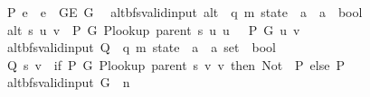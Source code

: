 \begin{isabellebody}
\ \ {\isachardoublequoteopen}P{\isacharprime}{\kern0pt}{\isacharprime}{\kern0pt}\ e\ {\isasymequiv}\ e\ {\isasymin}\ G{\isachardot}{\kern0pt}E\ G{}{\isachardoublequoteclose}\isanewline
\isanewline
{}\isamarkupfalse%
\ {\isacharparenleft}{\kern0pt}\ alt{\isacharunderscore}{\kern0pt}bfs{\isacharunderscore}{\kern0pt}valid{\isacharunderscore}{\kern0pt}input{\isacharparenright}{\kern0pt}\ alt\ {\isacharcolon}{\kern0pt}{\isacharcolon}{\kern0pt}\ {\isachardoublequoteopen}{\isacharparenleft}{\kern0pt}{\isacharprime}{\kern0pt}q{\isacharcomma}{\kern0pt}\ {\isacharprime}{\kern0pt}m{\isacharparenright}{\kern0pt}\ state\ {\isasymRightarrow}\ {\isacharprime}{\kern0pt}a\ {\isasymRightarrow}\ {\isacharprime}{\kern0pt}a\ {\isasymRightarrow}\ bool{\isachardoublequoteclose}\ \isanewline
\ \ {\isachardoublequoteopen}alt\ s\ u\ v\ {\isasymequiv}\ P{\isacharprime}{\kern0pt}\ G{}\ {\isacharparenleft}{\kern0pt}P{\isacharunderscore}{\kern0pt}lookup\ {\isacharparenleft}{\kern0pt}parent\ s{\isacharparenright}{\kern0pt}\ u{\isacharparenright}{\kern0pt}\ u\ {\isasymlongleftrightarrow}\ {\isasymnot}\ P\ G{}\ u\ v{\isachardoublequoteclose}\isanewline
\isanewline
{}\isamarkupfalse%
\ {\isacharparenleft}{\kern0pt}\ alt{\isacharunderscore}{\kern0pt}bfs{\isacharunderscore}{\kern0pt}valid{\isacharunderscore}{\kern0pt}input{\isacharparenright}{\kern0pt}\ Q\ {\isacharcolon}{\kern0pt}{\isacharcolon}{\kern0pt}\ {\isachardoublequoteopen}{\isacharparenleft}{\kern0pt}{\isacharprime}{\kern0pt}q{\isacharcomma}{\kern0pt}\ {\isacharprime}{\kern0pt}m{\isacharparenright}{\kern0pt}\ state\ {\isasymRightarrow}\ {\isacharprime}{\kern0pt}a\ {\isasymRightarrow}\ {\isacharprime}{\kern0pt}a\ set\ {\isasymRightarrow}\ bool{\isachardoublequoteclose}\ \isanewline
\ \ {\isachardoublequoteopen}Q\ s\ v\ {\isasymequiv}\ if\ P{\isacharprime}{\kern0pt}\ G{}\ {\isacharparenleft}{\kern0pt}P{\isacharunderscore}{\kern0pt}lookup\ {\isacharparenleft}{\kern0pt}parent\ s{\isacharparenright}{\kern0pt}\ v{\isacharparenright}{\kern0pt}\ v\ then\ {\isacharparenleft}{\kern0pt}Not\ {\isasymcirc}\ P{\isacharprime}{\kern0pt}{\isacharprime}{\kern0pt}{\isacharparenright}{\kern0pt}\ else\ P{\isacharprime}{\kern0pt}{\isacharprime}{\kern0pt}{\isachardoublequoteclose}\isanewline
\isanewline
{}\isamarkupfalse%
\ {\isacharparenleft}{\kern0pt}\ alt{\isacharunderscore}{\kern0pt}bfs{\isacharunderscore}{\kern0pt}valid{\isacharunderscore}{\kern0pt}input{\isacharparenright}{\kern0pt}\ G\ {\isacharcolon}{\kern0pt}{\isacharcolon}{\kern0pt}\ {\isacharprime}{\kern0pt}n\ \isanewline

\end{isabellebody}
